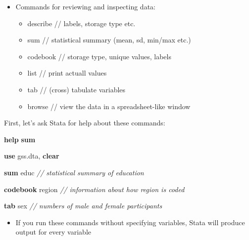 \documentclass[
]{book}
\newenvironment{Shaded}{\begin{snugshade}}{\end{snugshade}}
\newcommand{\CommentTok}[1]{\textcolor[rgb]{0.56,0.35,0.01}{\textit{#1}}}
\newcommand{\KeywordTok}[1]{\textcolor[rgb]{0.13,0.29,0.53}{\textbf{#1}}}
\newcommand{\NormalTok}[1]{#1}
\providecommand{\tightlist}{%
  \setlength{\itemsep}{0pt}\setlength{\parskip}{0pt}}
\begin{document}
\begin{itemize}
\tightlist
\item
  Commands for reviewing and inspecting data:

  \begin{itemize}
  \tightlist
  \item
    describe // labels, storage type etc.
  \item
    sum // statistical summary (mean, sd, min/max etc.)
  \item
    codebook // storage type, unique values, labels
  \item
    list // print actuall values
  \item
    tab // (cross) tabulate variables
  \item
    browse // view the data in a spreadsheet-like window
  \end{itemize}
\end{itemize}

First, let's ask Stata for help about these commands:

\begin{Shaded}
\begin{Highlighting}[]
\KeywordTok{help} \KeywordTok{sum}
\end{Highlighting}
\end{Shaded}

\begin{Shaded}
\begin{Highlighting}[]
\KeywordTok{use}\NormalTok{ gss.dta, }\KeywordTok{clear}

\KeywordTok{sum}\NormalTok{ educ }\CommentTok{// statistical summary of education}
\end{Highlighting}
\end{Shaded}

\begin{Shaded}
\begin{Highlighting}[]
\KeywordTok{codebook}\NormalTok{ region }\CommentTok{// information about how region is coded}
\end{Highlighting}
\end{Shaded}

\begin{Shaded}
\begin{Highlighting}[]
\KeywordTok{tab}\NormalTok{ sex }\CommentTok{// numbers of male and female participants}
\end{Highlighting}
\end{Shaded}

\begin{itemize}
\tightlist
\item
  If you run these commands without specifying variables, Stata will produce output for every variable
\end{itemize}
\end{document}
